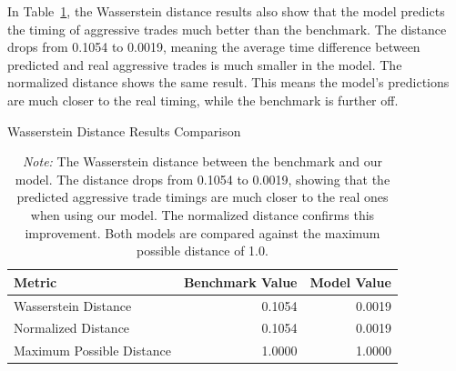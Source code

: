 In Table~\ref{tb:wasserstein_com}, the Wasserstein distance results also show that the model predicts the timing of aggressive trades much better than the benchmark. The distance drops from 0.1054 to 0.0019, meaning the average time difference between predicted and real aggressive trades is much smaller in the model. The normalized distance shows the same result. This means the model's predictions are much closer to the real timing, while the benchmark is further off.
\begin{table}[H]
    \centering
    \caption{Wasserstein Distance Results Comparison}
    \caption*{\textit{Note:} The Wasserstein distance between the benchmark and our model. The distance drops from 0.1054 to 0.0019, showing that the predicted aggressive trade timings are much closer to the real ones when using our model. The normalized distance confirms this improvement. Both models are compared against the maximum possible distance of 1.0.}

    \label{tb:wasserstein_com}
    \begin{tabular}{lrr}
    \toprule
    Metric & Benchmark Value & Model Value\\
    \midrule
    Wasserstein Distance & 0.1054 & 0.0019 \\  %
    Normalized Distance & 0.1054 & 0.0019 \\  %
    Maximum Possible Distance & 1.0000 & 1.0000 \\
    \bottomrule
    \end{tabular}
\end{table}

